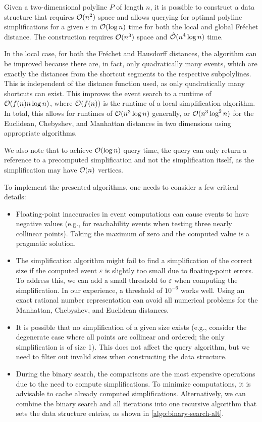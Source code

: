 \begin{corollary}
	Given a two-dimensional polyline \(P\) of length \(n\), it is possible to construct a data structure that requires \(\mathcal{O}(n^2)\) space and allows querying for optimal polyline simplifications for a given \(\varepsilon\) in \(\mathcal{O}(\log n)\) time for both the local and global Fréchet distance. The construction requires \(\mathcal{O}(n^3)\) space and \(\hat{\mathcal{O}}(n^4 \log n)\) time.
\end{corollary}

In the local case, for both the Fréchet and Hausdorff distances, the algorithm can be improved because there are, in fact, only quadratically many events, which are exactly the distances from the shortcut segments to the respective subpolylines. This is independent of the distance function used, as only quadratically many shortcuts can exist. This improves the event search to a runtime of \(\mathcal{O}(f(n) n \log n)\), where \(\mathcal{O}(f(n))\) is the runtime of a local simplification algorithm. In total, this allows for runtimes of \(\mathcal{O}(n^3 \log n)\) generally, or \(\mathcal{O}(n^3 \log^2 n)\) for the Euclidean, Chebyshev, and Manhattan distances in two dimensions using appropriate algorithms.

We also note that to achieve \(\mathcal{O}(\log n)\) query time, the query can only return a reference to a precomputed simplification and not the simplification itself, as the simplification may have \(\mathcal{O}(n)\) vertices. 

To implement the presented algorithms, one needs to consider a few critical details:
\begin{itemize}
	\item Floating-point inaccuracies in event computations can cause events to have negative values (e.g., for reachability events when testing three nearly collinear points). Taking the maximum of zero and the computed value is a pragmatic solution.
	\item The simplification algorithm might fail to find a simplification of the correct size if the computed event \(\varepsilon\) is slightly too small due to floating-point errors. To address this, we can add a small threshold to \(\varepsilon\) when computing the simplification. In our experience, a threshold of \(10^{-6}\) works well. Using an exact rational number representation can avoid all numerical problems for the Manhattan, Chebyshev, and Euclidean distances.
	\item It is possible that no simplification of a given size exists (e.g., consider the degenerate case where all points are collinear and ordered; the only simplification is of size 1). This does not affect the query algorithm, but we need to filter out invalid sizes when constructing the data structure.
	\item During the binary search, the comparisons are the most expensive operations due to the need to compute simplifications. To minimize computations, it is advisable to cache already computed simplifications. Alternatively, we can combine the binary search and all iterations into one recursive algorithm that sets the data structure entries, as shown in \cref{algo:binary-search-alt}.
\end{itemize}

